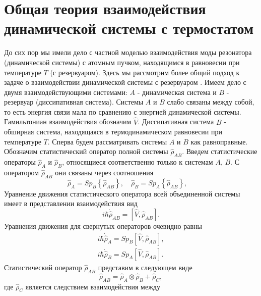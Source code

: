 \section{Общая теория взаимодействия динамической системы с
  термостатом}

До сих пор мы имели дело с частной моделью взаимодействия моды
резонатора (динамической системы) с атомным пучком, находящимся в
равновесии при
температуре  $T$  (с резервуаром). Здесь мы рассмотрим более общий
подход к задаче о взаимодействии динамической системы с резервуаром
\cite{bLaks1974}. Имеем дело с двумя взаимодействующими
системами:  $A$ - динамическая система и  $B$ - резервуар
(диссипативная система). Системы $A$ и $B$ слабо связаны между собой,
то есть энергия связи мала по сравнению с энергией динамической
системы. Гамильтониан взаимодействия обозначим $\hat{V}$.
Диссипативная система  $B$ - обширная система, находящаяся в
термодинамическом равновесии при температуре $T$.  Сперва будем
рассматривать системы  $A$ и $B$ как равноправные. Обозначим
статистический оператор полной системы $\hat{\rho}_{AB}$. 
Введем статистические операторы $\hat{\rho}_{A}$ и $\hat{\rho}_{B}$,
относящиеся соответственно только к системам $A$, $B$.   
С оператором $\hat{\rho}_{AB}$ они связаны через соотношения 
\begin{equation}
\hat{\rho}_{A} = Sp_B\left\{\hat{\rho}_{AB}\right\}, \quad
\hat{\rho}_{B} = Sp_A\left\{\hat{\rho}_{AB}\right\}, \quad
\label{eqCh2_78}
\end{equation}
Уравнение движения статистического оператора всей объединенной системы
имеет в представлении взаимодействия вид 
\begin{equation}
i\hbar\dot{\hat{\rho}}_{AB}
 = \left[
\hat{V}, \hat{\rho}_{AB}
\right].
\label{eqCh2_79}
\end{equation}
Уравнения движения для свернутых операторов очевидно равны
\begin{eqnarray}
i\hbar\dot{\hat{\rho}}_{A} = Sp_B
\left[
\hat{V}, \hat{\rho}_{AB}
\right],
\nonumber \\
i\hbar\dot{\hat{\rho}}_{B} = Sp_A
\left[
\hat{V}, \hat{\rho}_{AB}
\right].
\label{eqCh2_80}
\end{eqnarray}
Статистический оператор $\hat{\rho}_{AB}$ представим в следующем виде
\begin{equation}
\hat{\rho}_{AB} = \hat{\rho}_{A} \otimes \hat{\rho}_{B} + \hat{\rho}_{C},
\label{eqCh2_81}
\end{equation}
где $\hat{\rho}_{C}$ является следствием взаимодействия между
